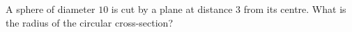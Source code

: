 A sphere of diameter $10$ is cut by a plane at distance $3$ from its centre. What is the radius of the circular cross-section?
